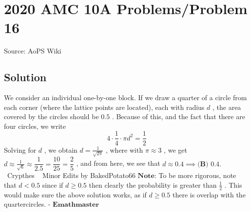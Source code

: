 \documentclass[12pt]{article}
\begin{document}
\section*{{2020 AMC 10A Problems/Problem 16}}
Source: AoPS Wiki

\subsection*{Solution}
We consider an individual one-by-one block. If we draw a quarter of a circle from each corner (where the lattice points are located), each with radius $d$ , the area covered by the circles should be $0.5$ . Because of this, and the fact that there are four circles, we write \[4 \cdot \frac{1}{4} \cdot \pi d^2 = \frac{1}{2}\] Solving for $d$ , we obtain $d = \frac{1}{\sqrt{2\pi}}$ , where with $\pi \approx 3$ , we get $d \approx \frac{1}{\sqrt{6}} \approx \dfrac{1}{2.5} = \dfrac{10}{25} = \dfrac{2}{5}$ , and from here, we see that $d \approx 0.4 \implies \boxed{\textbf{(B) } 0.4}.$ ~Crypthes ~ Minor Edits by BakedPotato66 $\textbf{Note:}$ To be more rigorous, note that $d<0.5$ since if $d\geq0.5$ then clearly the probability is greater than $\frac{1}{2}$ . This would make sure the above solution works, as if $d\geq0.5$ there is overlap with the quartercircles. $\textbf{- Emathmaster}$
\end{document}
